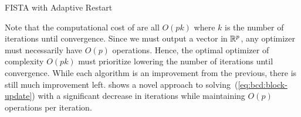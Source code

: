 \begin{algorithm}
    \caption{FISTA with Adaptive Restart}\label{alg:pgd:fista-adares}
\end{algorithm}

Note that the computational cost of 
are all $O(p k)$ where $k$ is the number of iterations until convergence.
Since we must output a vector in $\mathbb{R}^p$, 
any optimizer must necessarily have $O(p)$ operations.
Hence, the optimal optimizer of complexity $O(pk)$ must prioritize lowering 
the number of iterations until convergence.
While each algorithm is an improvement from the previous,
there is still much improvement left.
 shows a novel approach to solving~(\ref{eq:bcd:block-update})
with a significant decrease in iterations while maintaining $O(p)$ operations per iteration.

